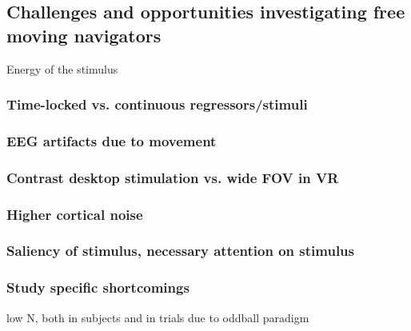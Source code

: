 
\subsection{Challenges and opportunities investigating free moving navigators}
Energy of the stimulus 

\subsubsection{Time-locked vs. continuous regressors/stimuli}
\subsubsection{EEG artifacts due to movement}
\subsubsection{Contrast desktop stimulation vs. wide FOV in VR}
\subsubsection{Higher cortical noise}
\subsubsection{Saliency of stimulus, necessary attention on stimulus} %
\subsubsection{Study specific shortcomings}
low N, both in subjects and in trials due to oddball paradigm
